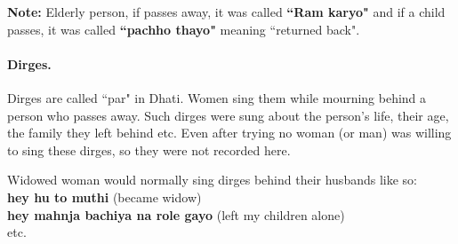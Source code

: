 \textbf{Note:} Elderly person, if passes away, it was called \textbf{``Ram
karyo"} and if a child passes, it was called \textbf{``pachho thayo"} meaning
``returned back".

\paragraph{Dirges.}
Dirges are called ``par" in Dhati. Women sing them while mourning behind a
person who passes away. Such dirges were sung about the person's life, their
age, the family they left behind etc. Even after trying no woman (or man) was
willing to sing these dirges, so they were not recorded here.

Widowed woman would normally sing dirges behind their husbands like so:\\
\textbf{hey hu to muthi} (became widow)\\
\textbf{hey mahnja bachiya na role gayo} (left my children alone)\\
etc.

